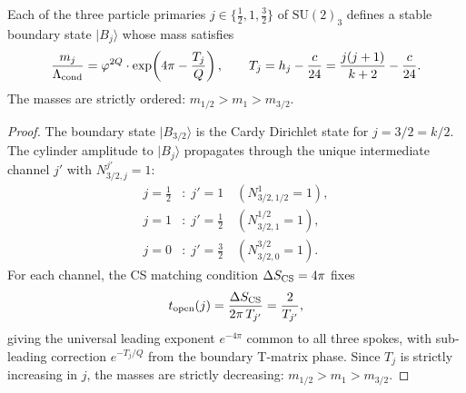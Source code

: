 \begin{theorem}
\label{P4:thm:spoke_mass_spectrum}
Each of the three particle primaries $j\in\{\tfrac{1}{2},1,\tfrac{3}{2}\}$
of $\mathrm{SU}(2)_3$ defines a stable boundary state $|B_j\rangle$ whose
mass satisfies
\begin{equation}
  \frac{m_j}{\Lambda_{\mathrm{cond}}}
  = \varphi^{2Q}\cdot\exp\!\left(4\pi - \frac{T_j}{Q}\right),
  \qquad
  T_j = h_j - \frac{c}{24} = \frac{j(j+1)}{k+2} - \frac{c}{24}.
  \label{P4:eq:spoke_mass_spectrum}
\end{equation}
The masses are strictly ordered: $m_{1/2} > m_1 > m_{3/2}$.
\end{theorem}
\begin{proof}
The boundary state $|B_{3/2}\rangle$ is the Cardy Dirichlet state for
$j=3/2=k/2$. The cylinder amplitude to $|B_j\rangle$ propagates through
the unique intermediate channel $j'$ with $N^{j'}_{3/2,j}=1$:
\begin{align}
  j = \tfrac{1}{2} &: \; j' = 1 \quad (N^1_{3/2,1/2}=1), \label{P4:eq:channel_12} \\
  j = 1 &: \; j' = \tfrac{1}{2} \quad (N^{1/2}_{3/2,1}=1), \label{P4:eq:channel_1} \\
  j = 0 &: \; j' = \tfrac{3}{2} \quad (N^{3/2}_{3/2,0}=1). \label{P4:eq:channel_0}
\end{align}
For each channel, the CS matching condition $\Delta S_{\rm CS}=4\pi$ fixes
\begin{equation}
  t_{\rm open}(j) = \frac{\Delta S_{\rm CS}}{2\pi\,T_{j'}} = \frac{2}{T_{j'}},
  \label{P4:eq:topen_j}
\end{equation}
giving the universal leading exponent $e^{-4\pi}$ common to all three
spokes, with sub-leading correction $e^{-T_j/Q}$ from the boundary
T-matrix phase. Since $T_j$ is strictly increasing in $j$, the masses
are strictly decreasing: $m_{1/2}>m_1>m_{3/2}$.
\end{proof}

